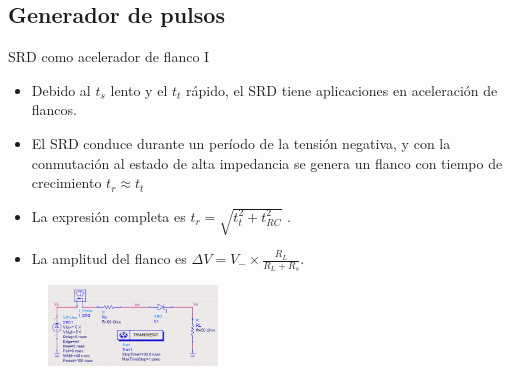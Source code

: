 \documentclass{beamer}
\begin{document}
\subsection{Generador de pulsos}

\begin{frame}{SRD como acelerador de flanco I}

    \begin{itemize}
        \item Debido al $t_s$ lento y el $t_t$ rápido, el SRD tiene
            aplicaciones en aceleración de flancos.
        \item El SRD conduce durante un período de la tensión negativa, y
            con la conmutación al estado de alta impedancia se genera un
            flanco con tiempo de crecimiento $t_r \approx t_t$
        \item La expresión completa es $t_r = \sqrt{t_t^2+t_{RC}^2}$
            \cite{an918}.
        \item La amplitud del flanco es $\Delta V = V_- \times
            \frac{R_L}{R_L+R_s}$.
    \end{itemize}

    \begin{figure}
      \centering
        \includegraphics[width=0.4\textwidth]{images/srd_sharpener_circuit.png}
        \label{fig:srd_sharpener}
    \end{figure}

\end{frame}
\end{document}
